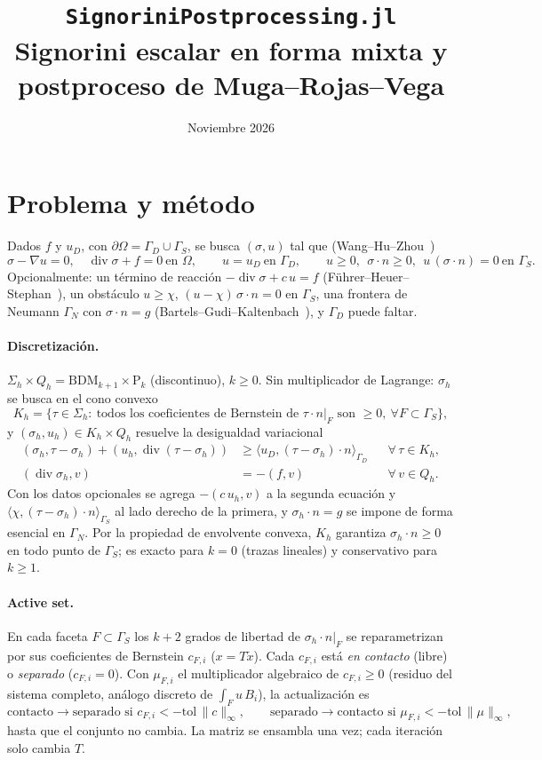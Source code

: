 \documentclass[11pt,a4paper]{article}
\title{\texttt{SignoriniPostprocessing.jl}\\[2pt]
  \large Signorini escalar en forma mixta y postproceso de Muga--Rojas--Vega}
\date{Noviembre 2026}
\newcommand{\BDM}{\mathrm{BDM}}
\newcommand{\Pk}[1]{\mathrm{P}_{#1}}
\newcommand{\dive}{\operatorname{div}}
\begin{document}
\maketitle

\section{Problema y método}

Dados $f$ y $u_D$, con $\partial\Omega=\Gamma_D\cup\Gamma_S$, se busca $(\sigma,u)$ tal que
(Wang--Hu--Zhou~\cite{wang})
\[
  \sigma-\nabla u=0,\quad \dive\sigma+f=0 \ \text{en }\Omega,\qquad
  u=u_D \ \text{en }\Gamma_D,\qquad
  u\ge 0,\ \ \sigma\cdot n\ge 0,\ \ u\,(\sigma\cdot n)=0 \ \text{en }\Gamma_S .
\]
Opcionalmente: un término de reacción $-\dive\sigma+c\,u=f$ (Führer--Heuer--Stephan~\cite{fhs}),
un obstáculo $u\ge\chi$, $(u-\chi)\,\sigma\cdot n=0$ en $\Gamma_S$, una frontera de Neumann
$\Gamma_N$ con $\sigma\cdot n=g$ (Bartels--Gudi--Kaltenbach~\cite{bgk}), y $\Gamma_D$ puede faltar.

\paragraph{Discretización.} $\Sigma_h\times Q_h=\BDM_{k+1}\times\Pk{k}$ (discontinuo), $k\ge 0$.
Sin multiplicador de Lagrange: $\sigma_h$ se busca en el cono convexo
\[
  K_h=\{\tau\in\Sigma_h:\ \text{todos los coeficientes de Bernstein de }
  \tau\cdot n|_F \text{ son } \ge 0,\ \forall F\subset\Gamma_S\},
\]
y $(\sigma_h,u_h)\in K_h\times Q_h$ resuelve la desigualdad variacional
\begin{align*}
  (\sigma_h,\tau-\sigma_h)+(u_h,\dive(\tau-\sigma_h)) &\ge \langle u_D,(\tau-\sigma_h)\cdot n\rangle_{\Gamma_D}
  && \forall\,\tau\in K_h,\\
  (\dive\sigma_h,v) &= -(f,v) && \forall\,v\in Q_h .
\end{align*}
Con los datos opcionales se agrega $-(c\,u_h,v)$ a la segunda ecuación y
$\langle\chi,(\tau-\sigma_h)\cdot n\rangle_{\Gamma_S}$ al lado derecho de la primera, y
$\sigma_h\cdot n=g$ se impone de forma esencial en $\Gamma_N$.
Por la propiedad de envolvente convexa, $K_h$ garantiza $\sigma_h\cdot n\ge0$ en todo punto de
$\Gamma_S$; es exacto para $k=0$ (trazas lineales) y conservativo para $k\ge1$.

\paragraph{Active set.} En cada faceta $F\subset\Gamma_S$ los $k+2$ grados de libertad de
$\sigma_h\cdot n|_F$ se reparametrizan por sus coeficientes de Bernstein $c_{F,i}$
($x=T\tilde x$). Cada $c_{F,i}$ está \emph{en contacto} (libre) o \emph{separado} ($c_{F,i}=0$).
Con $\mu_{F,i}$ el multiplicador algebraico de $c_{F,i}\ge0$ (residuo del sistema completo,
análogo discreto de $\int_F u\,B_i$), la actualización es
\[
  \text{contacto}\to\text{separado si } c_{F,i}<-\mathrm{tol}\,\|c\|_\infty,\qquad
  \text{separado}\to\text{contacto si } \mu_{F,i}<-\mathrm{tol}\,\|\mu\|_\infty ,
\]
hasta que el conjunto no cambia. La matriz se ensambla una vez; cada iteración solo cambia $T$.
\end{document}
